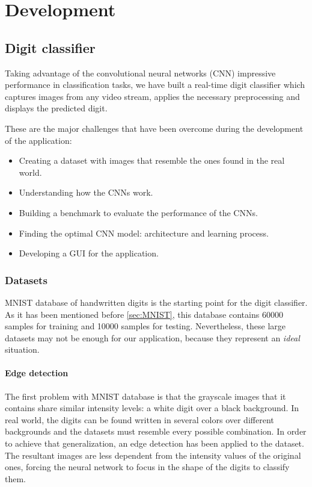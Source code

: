 \chapter{Development}\label{ch:development}

\section{Digit classifier}\label{sec:digitclass}
Taking advantage of the convolutional neural networks (CNN) impressive performance in classification tasks, we have built a real-time digit classifier which captures images from any video stream, applies the necessary preprocessing and displays the predicted digit.

These are the major challenges that have been overcome during the development of the application:
\begin{itemize}
	\item Creating a dataset with images that resemble the ones found in the real world.
	\item Understanding how the CNNs work.
	\item Building a benchmark to evaluate the performance of the CNNs.
	\item Finding the optimal CNN model: architecture and learning process.
	\item Developing a GUI for the application.
\end{itemize}
\subsection{Datasets}\label{subsec:datasets}
MNIST database of handwritten digits is the starting point for the digit classifier. As it has been mentioned before \ref{sec:MNIST}, this database contains 60000 samples for training and 10000 samples for testing. Nevertheless, these large datasets may not be enough for our application, because they represent an \textit{ideal} situation.

\subsubsection{Edge detection}
The first problem with MNIST database is that the grayscale images that it contains share similar intensity levels: a white digit over a black background. In real world, the digits can be found written in several colors over different backgrounds and the datasets must resemble every possible combination. In order to achieve that generalization, an edge detection has been applied to the dataset. The resultant images are less dependent from the intensity values of the original ones, forcing the neural network to focus in the shape of the digits to classify them.

